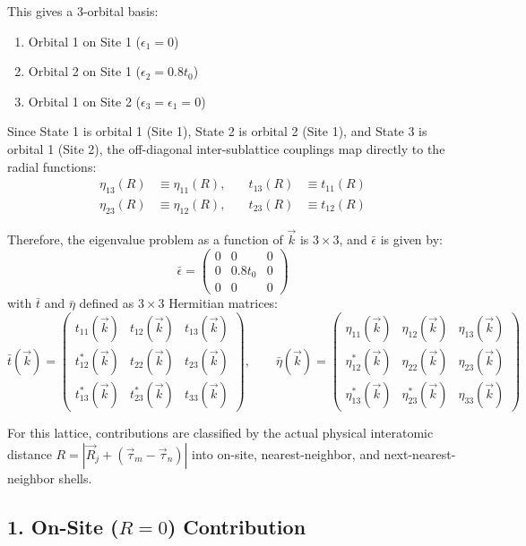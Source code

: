 \documentclass[11pt]{article}
\begin{document}
This gives a 3-orbital basis:
\begin{enumerate}
    \item Orbital 1 on Site 1 ($\epsilon_1 = 0$)
    \item Orbital 2 on Site 1 ($\epsilon_2 = 0.8t_0$)
    \item Orbital 1 on Site 2 ($\epsilon_3 = \epsilon_1 = 0$)
\end{enumerate}

Since State 1 is orbital 1 (Site 1), State 2 is orbital 2 (Site 1), and State 3 is orbital 1 (Site 2), the off-diagonal inter-sublattice couplings map directly to the radial functions:
\begin{align*}
\eta_{13}(R) &\equiv \eta_{11}(R), \quad &t_{13}(R) &\equiv t_{11}(R) \\
\eta_{23}(R) &\equiv \eta_{12}(R), \quad &t_{23}(R) &\equiv t_{12}(R)
\end{align*}

Therefore, the eigenvalue problem as a function of $\vec{k}$ is $3 \times 3$, and $\bar{\epsilon}$ is given by:
\[
	\bar{\epsilon} = \begin{pmatrix}
		0 & 0 & 0 \\
		0 & 0.8t_0 & 0 \\
		0 & 0 & 0
	\end{pmatrix}
\]
with $\bar{t}$ and $\bar{\eta}$ defined as $3 \times 3$ Hermitian matrices:
\[
	\bar{t}(\vec{k}) = \begin{pmatrix}
	t_{11}(\vec{k}) & t_{12}(\vec{k})  & t_{13}(\vec{k}) \\
	t_{12}^*(\vec{k}) & t_{22}(\vec{k}) & t_{23}(\vec{k}) \\
	t_{13}^*(\vec{k}) & t_{23}^*(\vec{k}) & t_{33}(\vec{k})
	\end{pmatrix}, \qquad
	\bar{\eta}(\vec{k}) = \begin{pmatrix}
	\eta_{11}(\vec{k})  & \eta_{12}(\vec{k})  & \eta_{13}(\vec{k}) \\
	\eta_{12}^*(\vec{k}) & \eta_{22}(\vec{k}) & \eta_{23}(\vec{k}) \\
	\eta_{13}^*(\vec{k})  & \eta_{23}^*(\vec{k}) & \eta_{33}(\vec{k})
	\end{pmatrix}
\]

For this lattice, contributions are classified by the actual physical interatomic distance $R = |\vec{R}_{j} + (\vec{\tau}_{m} - \vec{\tau}_{n})|$ into on-site, nearest-neighbor, and next-nearest-neighbor shells.

\subsection*{1. On-Site ($R = 0$) Contribution}
\end{document}
